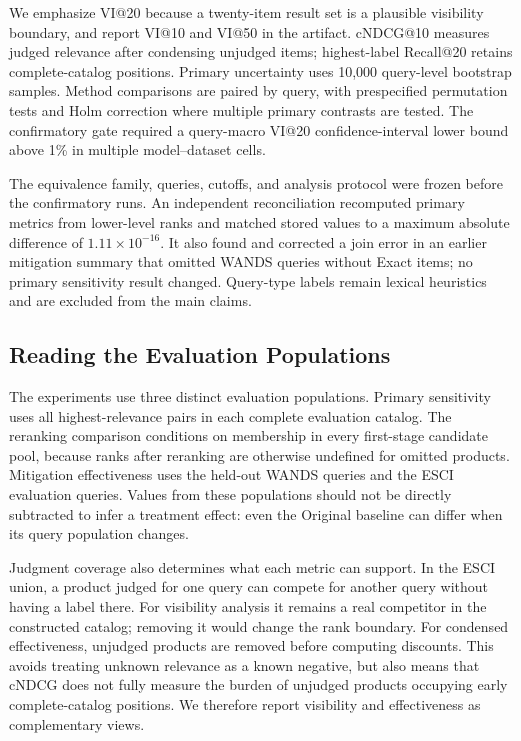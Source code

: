 We emphasize VI@20 because a twenty-item result set is a plausible visibility boundary, and report VI@10 and VI@50 in the artifact. cNDCG@10 measures judged relevance after condensing unjudged items; highest-label Recall@20 retains complete-catalog positions. Primary uncertainty uses 10,000 query-level bootstrap samples. Method comparisons are paired by query, with prespecified permutation tests and Holm correction where multiple primary contrasts are tested. The confirmatory gate required a query-macro VI@20 confidence-interval lower bound above 1\% in multiple model--dataset cells.

The equivalence family, queries, cutoffs, and analysis protocol were frozen before the confirmatory runs. An independent reconciliation recomputed primary metrics from lower-level ranks and matched stored values to a maximum absolute difference of $1.11\times10^{-16}$. It also found and corrected a join error in an earlier mitigation summary that omitted WANDS queries without Exact items; no primary sensitivity result changed. Query-type labels remain lexical heuristics and are excluded from the main claims.

\subsection{Reading the Evaluation Populations}

The experiments use three distinct evaluation populations. Primary sensitivity uses all highest-relevance pairs in each complete evaluation catalog. The reranking comparison conditions on membership in every first-stage candidate pool, because ranks after reranking are otherwise undefined for omitted products. Mitigation effectiveness uses the held-out WANDS queries and the ESCI evaluation queries. Values from these populations should not be directly subtracted to infer a treatment effect: even the Original baseline can differ when its query population changes.

Judgment coverage also determines what each metric can support. In the ESCI union, a product judged for one query can compete for another query without having a label there. For visibility analysis it remains a real competitor in the constructed catalog; removing it would change the rank boundary. For condensed effectiveness, unjudged products are removed before computing discounts. This avoids treating unknown relevance as a known negative, but also means that cNDCG does not fully measure the burden of unjudged products occupying early complete-catalog positions. We therefore report visibility and effectiveness as complementary views.

